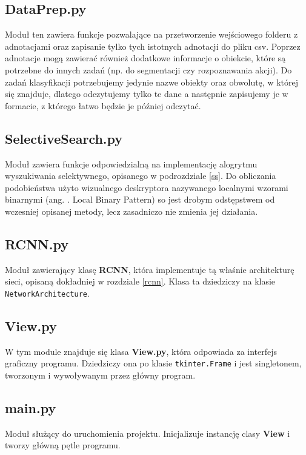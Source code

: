 \documentclass[a4paper,twoside,12pt]{book}
\newcommand{\obcy}[1]{\emph{#1}}
\newcommand{\ang}[1]{{\selectlanguage{british}\obcy{#1}}}
\begin{document}
{{\subsection{DataPrep.py}
{Moduł ten zawiera funkcje pozwalające na przetworzenie wejściowego folderu z adnotacjami oraz zapisanie tylko tych istotnych adnotacji do pliku csv. Poprzez adnotacje mogą zawierać również dodatkowe informacje o obiekcie, które są potrzebne do innych zadań (np. do segmentacji czy rozpoznawania akcji). Do zadań klasyfikacji potrzebujemy jedynie nazwe obiekty oraz obwolutę, w której się znajduje, dlatego odczytujemy tylko te dane a następnie zapisujemy je w formacie, z którego łatwo będzie je później odczytać. }
\subsection{SelectiveSearch.py}
{Moduł zawiera funkcje odpowiedzialną na implementację alogrytmu wyszukiwania selektywnego, opisanego w podrozdziale \ref{ss}. Do obliczania podobieństwa użyto wizualnego deskryptora nazywanego localnymi wzorami binarnymi (ang. \ang. Local Binary Pattern) so jest drobym odstępstwem od wczesniej opisanej metody, lecz zasadniczo nie zmienia jej działania. }
\subsection{RCNN.py}
{Moduł zawierający klasę \textbf{RCNN}, która implementuje tą właśnie architekturę sieci, opisaną dokładniej w rozdziale \ref{rcnn}. Klasa ta dziedziczy na klasie \lstinline|NetworkArchitecture|. }
\subsection{View.py}
{W tym module znajduje się klasa \textbf{View.py}, która odpowiada za interfejs graficzny programu. Dziedziczy ona po klasie \lstinline|tkinter.Frame| i jest singletonem, tworzonym i wywoływanym przez główny program.}
\subsection{main.py}
{Moduł służący do uruchomienia projektu. Inicjalizuje instancję clasy \textbf{View} i tworzy główną pętle programu.}

}}
\end{document}

